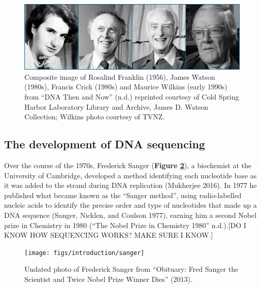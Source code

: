 \documentclass[
]{book}
\begin{document}
\begin{figure}
\includegraphics[width=1\linewidth]{figs/introduction/all_four} \caption{Composite image of Rosalind Franklin (1956), James Watson (1980s), Francis Crick (1980s) and Maurice Wilkins (early 1990s) from {``{DNA} Then and Now''} (n.d.) reprinted courtesy of Cold Spring Harbor Laboratory Library and Archive, James D. Watson Collection; Wilkins photo courtesy of TVNZ.}\label{fig:all-four}
\end{figure}

\hypertarget{the-development-of-dna-sequencing}{%
\subsection{The development of DNA sequencing}\label{the-development-of-dna-sequencing}}

Over the course of the 1970s, Frederick Sanger (\textbf{Figure \ref{fig:sanger}}), a biochemist at the University of Cambridge, developed a method identifying each nucleotide base as it was added to the strand during DNA replication (Mukherjee 2016). In 1977 he published what became known as the ``Sanger method'', using radio-labelled nucleic acids to identify the precise order and type of nucleotides that made up a DNA sequence (Sanger, Nicklen, and Coulson 1977), earning him a second Nobel prize in Chemistry in 1980 ({``The {Nobel Prize} in {Chemistry} 1980''} n.d.).{[}DO I KNOW HOW SEQUENCING WORKS? MAKE SURE I KNOW.{]}



\begin{figure}

\hfill{}\texttt{[image: figs/introduction/sanger]} 

\caption{Undated photo of Frederick Sanger from {``Obituary: {Fred Sanger} the Scientist and Twice {Nobel Prize} Winner Dies''} (2013).}\label{fig:sanger}
\end{figure}
\end{document}
